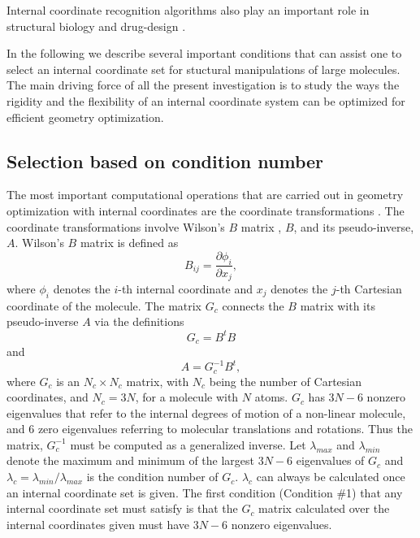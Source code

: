 \documentclass[prl,aps,preprint,superbib,12pt]{revtex4}
\begin{document}
Internal coordinate recognition algorithms also play an important role
in structural biology and drug-design \cite{AWSchuttelkopf04,GJKleywegt03}.

In the following we describe several important conditions 
that can assist one to select an internal coordinate set 
for stuctural manipulations of large molecules.
The main driving force of all the present investigation is to study the
ways the rigidity and the flexibility of an internal 
coordinate system can be optimized for efficient geometry optimization.

\subsection{Selection based on condition number}
The most important computational operations 
that are carried out in geometry optimization 
with internal coordinates are the coordinate transformations 
\cite{PPulay77}. The coordinate transformations involve
Wilson's $B$ matrix \cite{EWilson55}, $B$, and its pseudo-inverse, $A$.
Wilson's $B$ matrix is defined as
\begin{equation}
B_{ij} = \frac{\partial \phi_{i}}{\partial x_{j}},
\end{equation}
where $\phi_{i}$ denotes the $i$-th internal coordinate and $x_{j}$
denotes the $j$-th Cartesian coordinate of the molecule.
The matrix $G_{c}$ connects the $B$ matrix with its pseudo-inverse
$A$ via the definitions
\begin{equation}
G_{c} = B^{t} B
\end{equation}
and
\begin{equation}
A = G_{c}^{-1} B^{t} ,
\end{equation}
where $G_{c}$ is an $N_{c} \times N_{c}$ matrix, with $N_{c}$ being the
number of Cartesian coordinates, and $N_{c}=3N$, for a molecule
with $N$ atoms. $G_{c}$ has $3N-6$ nonzero eigenvalues that refer to 
the internal degrees of motion of a non-linear molecule, and
$6$ zero eigenvalues referring to molecular translations and rotations. 
Thus the
matrix, $G_{c}^{-1}$ must be computed as a generalized inverse. 
Let $\lambda_{max}$ and $\lambda_{min}$ denote the maximum and minimum
of the largest $3N-6$ eigenvalues of $G_{c}$ and 
$\lambda_{c}=\lambda_{min}/\lambda_{max}$ is the condition number
of $G_{c}$. 
$\lambda_{c}$ can always be calculated once
an internal coordinate set is given. 
The first condition (Condition \#1) that any internal coordinate set
must satisfy is that the $G_{c}$ matrix calculated over the 
internal coordinates given must have $3N-6$ nonzero eigenvalues. 
\end{document}
